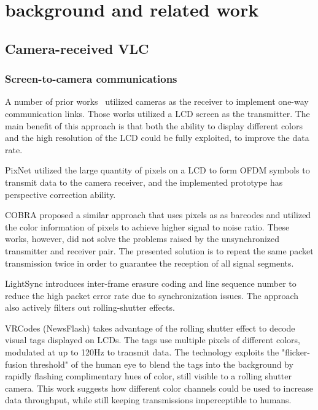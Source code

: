\section{background and related work}

\subsection{Camera-received VLC}
\subsubsection{Screen-to-camera communications}
A number of prior works~\cite{perli2010pixnet,hao2012cobra,hu2013lightsync} utilized cameras as the receiver to implement one-way communication links. Those works utilized a LCD screen as the transmitter. The main benefit of this approach is that both the ability to display different colors and the high resolution of the LCD could be fully exploited, to improve the data rate.

PixNet \cite{perli2010pixnet} utilized the large quantity of pixels on a LCD to form OFDM symbols to transmit data to the camera receiver, and the implemented prototype has perspective correction ability.

COBRA \cite{hao2012cobra} proposed a similar approach that uses pixels as as barcodes and utilized the color information of pixels to achieve higher signal to noise ratio.
These works, however, did not solve the problems raised by the unsynchronized transmitter and receiver pair. The presented solution is to repeat the same packet transmission twice in order to guarantee the reception of all signal segments.

LightSync \cite{hu2013lightsync} introduces inter-frame erasure coding and line sequence number to reduce the high packet error rate due to synchronization issues. The approach also actively filters out rolling-shutter effects.

VRCodes (NewsFlash) \cite{vrcodes} takes advantage of the rolling shutter effect to decode visual tags displayed on LCDs. The tags use multiple pixels of different colors, modulated at up to 120Hz to transmit data. The technology exploits the "flicker-fusion threshold" of the human eye to blend the tags into the background by rapidly flashing complimentary hues of color, still visible to a rolling shutter camera. This work suggests how different color channels could be used to increase data throughput, while still keeping transmissions imperceptible to humans.

